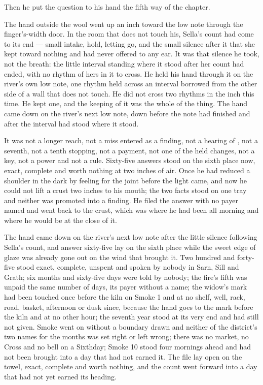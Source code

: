 Then he put the question to his hand the fifth way of the chapter.

The hand outside the wool went up an inch toward the low note through the finger's-width door. In the room that does not touch his, Sella's count had come to its end --- small intake, hold, letting go, and the small silence after it that she kept toward nothing and had never offered to any ear. It was that silence he took, not the breath: the little interval standing where it stood after her count had ended, with no rhythm of hers in it to cross. He held his hand through it on the river's own low note, one rhythm held across an interval borrowed from the other side of a wall that does not touch. He did not cross two rhythms in the inch this time. He kept one, and the keeping of it was the whole of the thing. The hand came down on the river's next low note, down before the note had finished and after the interval had stood where it stood.

It was not a longer reach, not a miss entered as a finding, not a hearing of , not a seventh, not a tenth stopping, not a payment, not one of the held changes, not a key, not a power and not a rule. Sixty-five answers stood on the sixth place now, exact, complete and worth nothing at two inches of air. Once he had reduced a shoulder in the dark by feeling for the joint before the light came, and now he could not lift a crust two inches to his mouth; the two facts stood on one tray and neither was promoted into a finding. He filed the answer with no payer named and went back to the crust, which was where he had been all morning and where he would be at the close of it.

The hand came down on the river's next low note after the little silence following Sella's count, and answer sixty-five lay on the sixth place while the sweet edge of glaze was already gone out on the wind that brought it. Two hundred and forty-five stood exact, complete, unspent and spoken by nobody in Sarn, Sill and Grath; six months and sixty-five days were told by nobody; the fire's fifth was unpaid the same number of days, its payer without a name; the widow's mark had been touched once before the kiln on Smoke 1 and at no shelf, well, rack, road, basket, afternoon or dusk since, because the hand goes to the mark before the kiln and at no other hour; the seventh year stood at its very end and had still not given. Smoke went on without a boundary drawn and neither of the district's two names for the months was set right or left wrong; there was no market, no Cross and no bell on a Sixthday; Smoke 10 stood four mornings ahead and had not been brought into a day that had not earned it. The file lay open on the towel, exact, complete and worth nothing, and the count went forward into a day that had not yet earned its heading.
